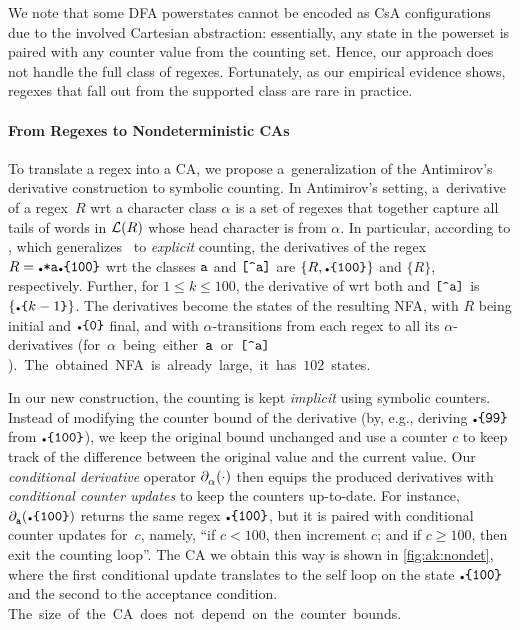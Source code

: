 \documentclass[acmsmall,screen]{acmart}
\begin{document}
We note that some DFA powerstates cannot be encoded as CsA configurations due to
the involved Cartesian abstraction: essentially, any state in the powerset is
paired with any counter value from the counting set.
%
Hence, our approach does not handle the full class of regexes.
%
Fortunately, as our empirical evidence shows, regexes that fall out from the
supported class are rare in practice.

\paragraph{From Regexes to Nondeterministic CAs}

To translate a regex into a CA, we propose a~generalization of the Antimirov's
derivative construction \cite{Antimirov96_partderivatives} to symbolic counting.
%
In Antimirov's setting, a~derivative of a regex~$R$ wrt a character class
$\alpha$ is a set of regexes that together capture all tails of words in
$\mathcal{L}(R)$ whose head character is from $\alpha$. 
%
In particular, according to \cite{VSXW19}, which
generalizes~\cite{Antimirov96_partderivatives} to \emph{explicit} counting, the derivatives
of the regex $R = \regex{\DOT*a\DOT\{100\}}$ wrt the classes $\texttt{a}$ and
$\notacl$ are $\{R,\regex{\DOT\{100\}}\}$ and $\{R\}$, respectively.
%
Further, for $1\leq k \leq 100$, the derivative of  wrt both
 and $\notacl$ is $\{ \regex{\DOT\{}k-1\regex{\}}\}$.
%
The derivatives become the states of the resulting NFA, with $R$ being
initial and $\regex{\DOT\{0\}}$ final, and with $\alpha$-transitions from each
regex to all its $\alpha$-derivatives \mbox{(for $\alpha$ being either $\texttt{a}$ or
$\notacl$).
%
The obtained NFA is already large, it has $102$ states.}

In our new construction, the counting is kept \emph{implicit} using symbolic
counters.
%
Instead of modifying the counter bound of the derivative (by, e.g., deriving
$\regex{\DOT\{99\}}$ from $\regex{\DOT\{100\}}$), we keep the original bound unchanged
and use a counter $c$ to keep track of the difference between the original value
and the current value.
%
Our \emph{conditional derivative} operator $\partial_{\alpha}^{{}}(\cdot)$ then equips the
produced derivatives with \emph{conditional counter updates} to keep the
counters up-to-date.
%
For instance, $\CD{\regex a}{\regex{\DOT\{100\}}}$ returns the same regex
$\regex{\DOT\{100\}}$, but it is paired with conditional counter updates for~$c$,
namely, ``if $c < 100$, then increment $c$; and if $c \geq 100$, then exit the
counting loop''.
%
The CA we obtain this way is shown in \cref{fig:ak:nondet}, where the first
conditional update translates to the self loop on the state $\regex{\DOT\{100\}}$
and the second to the acceptance condition.
%
\mbox{The size of the CA does not depend on the counter bounds.}
%
\end{document}
